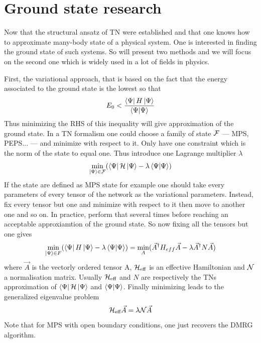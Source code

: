     \section{Ground state research}
        
        Now that the structural ansatz of TN were established and that one knows how to approximate many-body state of a physical system. One is interested in finding the ground state of such systems. So will present two methods and we will focus on the second one which is widely used in a lot of fields in physics.
        
        First, the variational approach, that is based on the fact that the energy associated to the ground state is the lowest so that
        \begin{equation}
            E_0 < \frac{\bra{\Psi}H\ket{\Psi}}{\bra{\Psi}\ket{\Psi}}
        \end{equation}
        Thus minimizing the RHS of this inequality will give approximation of the ground state. In a TN formalism one could choose a family of state $\mathcal F$ --- MPS, PEPS... --- and minimize with respect to it. Only have one constraint which is the norm of the state to equal one. Thus introduce one Lagrange multiplier $\lambda$
        \begin{equation}
            \min_{\ket{\Psi} \in \mathcal F}(\bra{\Psi}\mathcal H\ket{\Psi} - \lambda \bra{\Psi}\ket{\Psi})
        \end{equation}
        If the state are defined as MPS state for example one should take every parameters of every tensor of the network as the variational parameters. Instead, fix every tensor but one and minimize with respect to it then move to another one and so on. In practice, perform that several times before reaching an acceptable approxiamtion of the ground state. So now fixing all the tensors but one gives
        \begin{equation}
            \min_{\ket{\Psi} \in F}(\bra{\Psi}H\ket{\Psi} - \lambda \bra{\Psi}\ket{\Psi}) = \min_A(\Vec{A}^{\dagger}H_{eff}\Vec{A} - \lambda\Vec{A}^{\dagger}N\Vec{A})
        \end{equation}
        where $\Vec{A}$ is the vectorly ordered tensor A, $\mathcal H_\text{eff}$ is an effective Hamiltonian and $\mathcal N$ a normalisation matrix. Usually $\mathcal H_\text{eff}$ and $N$ are respectively the TNs approximation of $\bra{\Psi}\mathcal H\ket{\Psi}$ and $\bra{\Psi}\ket{\Psi}$. Finally minimizing leads to the generalized eigenvalue problem
        \begin{equation}
            \mathcal H_\text{eff}\Vec{A} = \lambda \mathcal N\Vec{A}
        \end{equation}
        Note that for MPS with open boundary conditions, one just recovers the DMRG algorithm.

